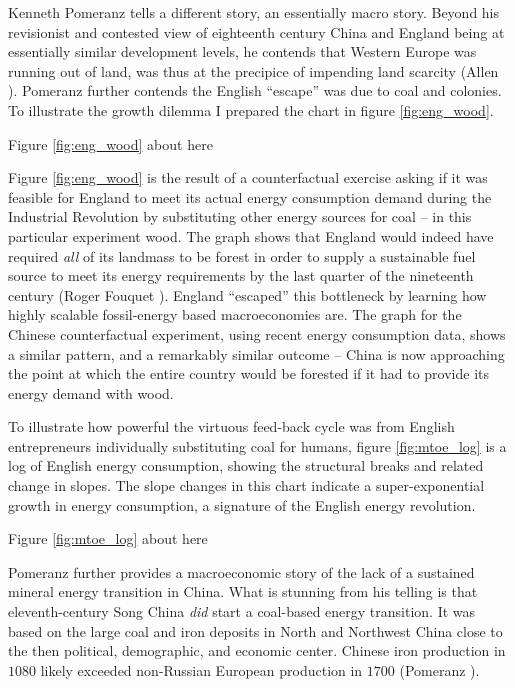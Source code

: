 \documentclass[12pt]{article}
\numberwithin{equation}{section}
\begin{document}
		Kenneth Pomeranz tells a different story, an essentially macro story. Beyond his revisionist and contested view of eighteenth century China and England being at essentially similar development levels, he contends that Western Europe was running out of land, was thus at the precipice of impending land scarcity (Allen \citeyear[p.~264]{allen_british_2009}). Pomeranz further contends the English ``escape'' was due to coal and colonies. To illustrate the growth dilemma I prepared the chart in figure  \ref{fig:eng_wood}. 
		
\begin{center}
Figure \ref{fig:eng_wood} about here
\end{center}
			

	
		Figure \ref{fig:eng_wood} is the result of a counterfactual exercise asking if it was feasible for England to meet its actual energy consumption demand during the Industrial Revolution by substituting other energy sources for coal -- in this particular experiment wood.  The graph shows that England would indeed have required \textit{all} of its landmass to be forest in order to supply a sustainable fuel source to meet its energy requirements by the last quarter of the nineteenth century (Roger Fouquet \citeyear{fouquet_heat_2008}). England ``escaped'' this bottleneck by learning how highly scalable fossil-energy based macroeconomies are. The graph for the Chinese counterfactual experiment, using recent energy consumption data, shows a similar pattern, and a remarkably similar outcome -- China is now approaching the point at which the entire country would be forested if it had to provide its energy demand with wood.
		
		To illustrate how powerful the virtuous feed-back cycle was from English entrepreneurs individually substituting coal for humans, figure \ref{fig:mtoe_log} is a log of English energy consumption, showing the structural breaks and related change in slopes. The slope changes in this chart indicate a super-exponential growth in energy consumption, a signature of the English energy revolution.

\begin{center}
Figure \ref{fig:mtoe_log} about here
\end{center}
			
				
		Pomeranz further provides a macroeconomic story of the lack of a sustained mineral energy transition in China. What is stunning from his telling is that eleventh-century Song China \textit{did} start a coal-based energy transition. It was based on the large coal and iron deposits in North and Northwest China close to the then political, demographic, and economic center. Chinese iron production in $1080$ likely exceeded non-Russian European production in $1700$ (Pomeranz \citeyear[p.~62]{pomeranz_great_2001}).
		
\end{document}
